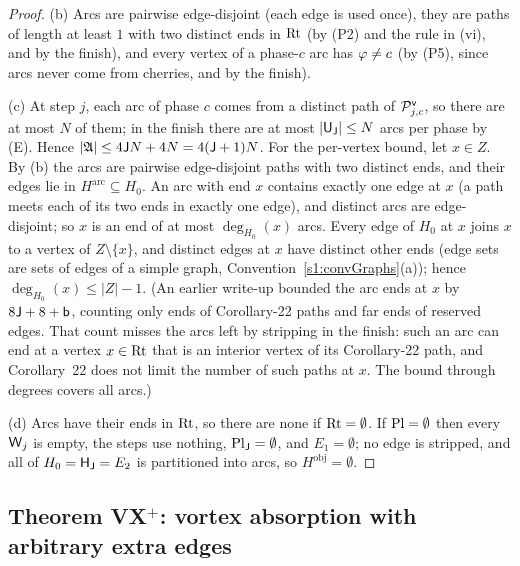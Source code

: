 \begin{proof}
(b) Arcs are pairwise edge-disjoint (each edge is used once), they are paths of length at least $1$ with two
distinct ends in $\mathrm{Rt}$ (by (P2) and the rule in (vi), and by the finish), and every vertex of a phase-$c$ arc has
$\varphi\ne c$ (by (P5), since arcs never come from cherries, and by the finish).

(c) At step $j$, each arc of phase $c$ comes from a distinct path of $\mathcal{P}^{\mathsf{v}}_{j,c}$, so there are at most $N$ of
them; in the finish there are at most $|\mathsf{U}_{\mathsf{J}}|\le N$ arcs per phase by \textup{(E)}. Hence
$|\mathfrak A|\le4\mathsf{J} N+4N=4(\mathsf{J}+1)N$. For the per-vertex bound, let $x\in Z$. By (b) the arcs are pairwise
edge-disjoint paths with two distinct ends, and their edges lie in $H^{\mathrm{arc}}\subseteq H_0$. An arc with end
$x$ contains exactly one edge at $x$ (a path meets each of its two ends in exactly one edge), and distinct arcs are
edge-disjoint; so $x$ is an end of at most $\deg_{H_0}(x)$ arcs. Every edge of $H_0$ at $x$ joins $x$ to a vertex of
$Z\setminus\{x\}$, and distinct edges at $x$ have distinct other ends (edge sets are sets of edges of a simple graph,
Convention~\ref{s1:convGraphs}(a)); hence $\deg_{H_0}(x)\le|Z|-1$. (An earlier write-up bounded the arc ends at $x$
by $8\mathsf{J}+8+\mathsf{b}$, counting only ends of Corollary-22 paths and far ends of reserved edges. That count misses the arcs
left by stripping in the finish: such an arc can end at a vertex $x\in\mathrm{Rt}$ that is an interior vertex of its
Corollary-22 path, and Corollary~22 does not limit the number of such paths at $x$. The bound through degrees covers
all arcs.)

(d) Arcs have their ends in $\mathrm{Rt}$, so there are none if $\mathrm{Rt}=\emptyset$. If $\mathrm{Pl}=\emptyset$ then every $\mathsf{W}_j$ is
empty, the steps use nothing, $\mathrm{Pl}_{\mathsf{J}}=\emptyset$, and $E_1=\emptyset$; no edge is stripped, and all of
$H_0=\mathsf{H}_{\mathsf{J}}=E_2$ is partitioned into arcs, so $H^{\mathrm{obj}}=\emptyset$.
\end{proof}

\subsection{Theorem \texorpdfstring{VX$^+$}{VX+}: vortex absorption with arbitrary extra edges}\label{s4:ssecVX}

